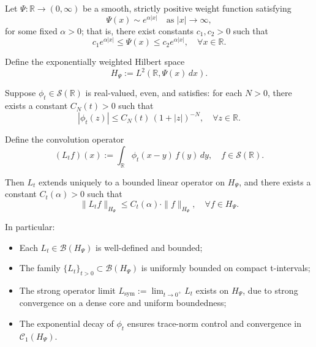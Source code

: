 \begin{proposition}
\label{prop:boundedness_Lt_weighted}
Let \( \Psi \colon \mathbb{R} \to (0,\infty) \) be a smooth, strictly positive weight function satisfying
\[
\Psi(x) \sim e^{\alpha |x|} \quad \text{as } |x| \to \infty,
\]
for some fixed \( \alpha > 0 \); that is, there exist constants \( c_1, c_2 > 0 \) such that
\[
c_1 e^{\alpha |x|} \le \Psi(x) \le c_2 e^{\alpha |x|}, \quad \forall x \in \mathbb{R}.
\]

Define the exponentially weighted Hilbert space
\[
H_\Psi := L^2(\mathbb{R}, \Psi(x)\, dx).
\]

Suppose \( \phi_t \in \mathcal{S}(\mathbb{R}) \) is real-valued, even, and satisfies: for each \( N > 0 \), there exists a constant \( C_N(t) > 0 \) such that
\[
|\phi_t(z)| \le C_N(t)\, (1 + |z|)^{-N}, \quad \forall z \in \mathbb{R}.
\]

Define the convolution operator
\[
(L_t f)(x) := \int_{\mathbb{R}} \phi_t(x - y)\, f(y)\, dy, \quad f \in \mathcal{S}(\mathbb{R}).
\]

Then \( L_t \) extends uniquely to a bounded linear operator on \( H_\Psi \), and there exists a constant \( C_t(\alpha) > 0 \) such that
\[
\| L_t f \|_{H_\Psi} \le C_t(\alpha) \cdot \| f \|_{H_\Psi}, \quad \forall f \in H_\Psi.
\]

In particular:
\begin{itemize}
    \item Each \( L_t \in \mathcal{B}(H_\Psi) \) is well-defined and bounded;
    \item The family \( \{L_t\}_{t > 0} \subset \mathcal{B}(H_\Psi) \) is uniformly bounded on compact t-intervals;
    \item The strong operator limit \( L_{\mathrm{sym}} := \lim_{t \to 0^+} L_t \) exists on \( H_\Psi \), due to strong convergence on a dense core and uniform boundedness;
    \item The exponential decay of \( \phi_t \) ensures trace-norm control and convergence in \( \mathcal{C}_1(H_\Psi) \).
\end{itemize}
\end{proposition}
